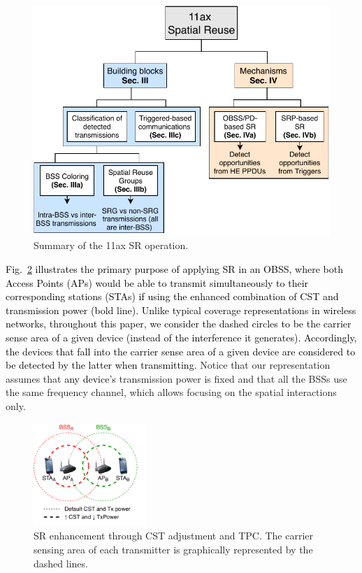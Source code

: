 \documentclass[preprint,12pt]{elsarticle}
\begin{document}
\begin{figure}[ht!]
	\centering
	\includegraphics[width=.55\columnwidth]{sr_summary}
	\caption{Summary of the 11ax SR operation.}
	\label{fig:sr_summary}
\end{figure}

\textcolor{black}{Fig.~\ref{fig:spatial_reuse_11ax} illustrates the primary purpose of applying SR in an OBSS, where both Access Points (APs) would be able to transmit simultaneously to their corresponding stations (STAs) if using the enhanced combination of CST and transmission power (bold line). Unlike typical coverage representations in wireless networks, throughout this paper, we consider the dashed circles to be the carrier sense area of a given device (instead of the interference it generates). Accordingly, the devices that fall into the carrier sense area of a given device are considered to be detected by the latter when transmitting.} Notice that our representation assumes that \textcolor{black}{any device's} transmission power is fixed and that all the BSSs use the same frequency channel, which allows focusing on the spatial interactions only. 
\begin{figure}[ht!]
	\centering
	\includegraphics[width=0.38\textwidth]{fig_1.pdf}
	\caption{SR enhancement through CST adjustment and TPC. The carrier sensing area of each transmitter is graphically represented by the dashed lines.}
	\label{fig:spatial_reuse_11ax}
\end{figure}
\end{document}
